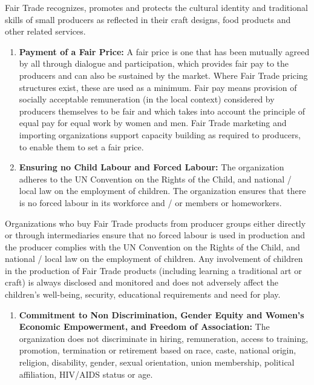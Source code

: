 \documentclass[]{book}
\providecommand{\tightlist}{%
  \setlength{\itemsep}{0pt}\setlength{\parskip}{0pt}}
\begin{document}
Fair Trade recognizes, promotes and protects the cultural identity and traditional skills of small producers as reflected in their craft designs, food products and other related services.

\begin{enumerate}
\def\labelenumi{\arabic{enumi}.}
\setcounter{enumi}{3}
\item
  \textbf{Payment of a Fair Price:}
  A fair price is one that has been mutually agreed by all through dialogue and participation, which provides fair pay to the producers and can also be sustained by the market. Where Fair Trade pricing structures exist, these are used as a minimum. Fair pay means provision of socially acceptable remuneration (in the local context) considered by producers themselves to be fair and which takes into account the principle of equal pay for equal work by women and men. Fair Trade marketing and importing organizations support capacity building as required to producers, to enable them to set a fair price.
\item
  \textbf{Ensuring no Child Labour and Forced Labour:}
  The organization adheres to the UN Convention on the Rights of the Child, and national / local law on the employment of children. The organization ensures that there is no forced labour in its workforce and / or members or homeworkers.
\end{enumerate}

Organizations who buy Fair Trade products from producer groups either directly or through intermediaries ensure that no forced labour is used in production and the producer complies with the UN Convention on the Rights of the Child, and national / local law on the employment of children. Any involvement of children in the production of Fair Trade products (including learning a traditional art or craft) is always disclosed and monitored and does not adversely affect the children's well-being, security, educational requirements and need for play.

\begin{enumerate}
\def\labelenumi{\arabic{enumi}.}
\setcounter{enumi}{5}
\tightlist
\item
  \textbf{Commitment to Non Discrimination, Gender Equity and Women's Economic Empowerment, and Freedom of Association:}
  The organization does not discriminate in hiring, remuneration, access to training, promotion, termination or retirement based on race, caste, national origin, religion, disability, gender, sexual orientation, union membership, political affiliation, HIV/AIDS status or age.
\end{enumerate}
\end{document}
